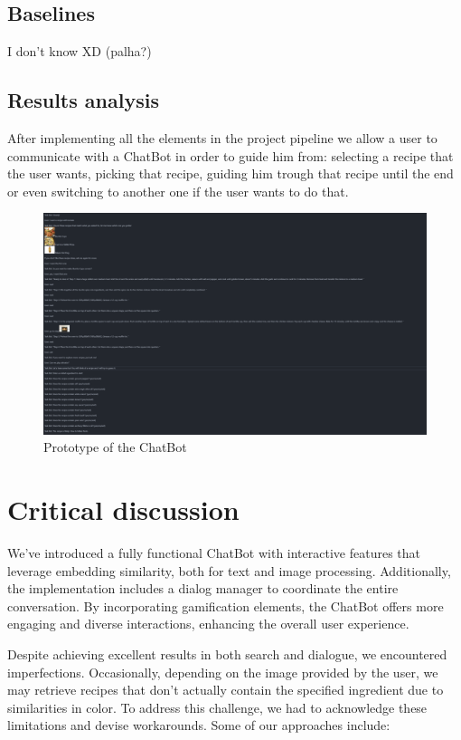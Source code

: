 \documentclass[runningheads]{llncs}
\begin{document}
\subsection{Baselines}
I don't know XD (palha?)
\subsection{Results analysis}
After implementing all the elements in the project pipeline we allow a user to communicate with a ChatBot in order to guide him from: selecting a recipe that the user wants, picking that recipe, guiding him trough that recipe until the end or even switching to another one if the user wants to do that.

\begin{figure}[!htbp]
    \center
    \includegraphics[scale=0.2]{images/prototype}
    \caption{Prototype of the ChatBot}
    \label{proto}
\end{figure}


\section{Critical discussion}
We've introduced a fully functional ChatBot with interactive features that leverage embedding similarity, both for text and image processing. Additionally, the implementation includes a dialog manager to coordinate the entire conversation. By incorporating gamification elements, the ChatBot offers more engaging and diverse interactions, enhancing the overall user experience.

Despite achieving excellent results in both search and dialogue, we encountered imperfections. Occasionally, depending on the image provided by the user, we may retrieve recipes that don't actually contain the specified ingredient due to similarities in color. To address this challenge, we had to acknowledge these limitations and devise workarounds. Some of our approaches include:
\end{document}

